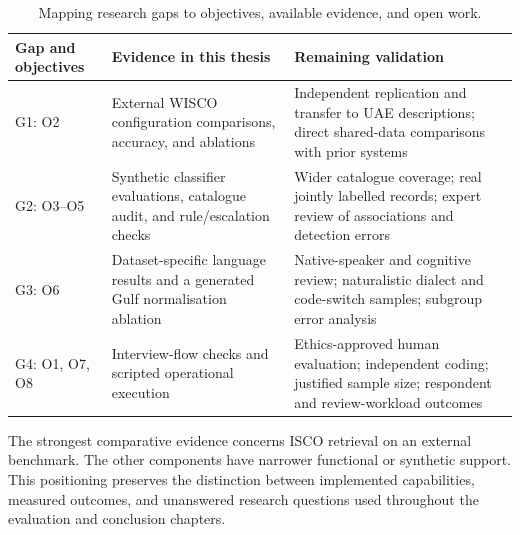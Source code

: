 \begin{table}[htbp]
\centering
\caption{Mapping research gaps to objectives, available evidence, and open work.}
\label{tab:ch2-gap-mapping}
\small\renewcommand{\arraystretch}{1.3}
\begin{tabular}{>{\raggedright}p{1.8cm}
                >{\raggedright}p{4.6cm}
                >{\raggedright\arraybackslash}p{5.7cm}}
\toprule
\textbf{Gap and objectives} & \textbf{Evidence in this thesis} &
\textbf{Remaining validation} \\
\midrule
G1: O2 & External WISCO configuration comparisons, accuracy, and
  ablations & Independent replication and transfer to UAE descriptions;
  direct shared-data comparisons with prior systems \\
G2: O3--O5 & Synthetic classifier evaluations, catalogue audit, and
  rule/escalation checks & Wider catalogue coverage; real jointly labelled
  records; expert review of associations and detection errors \\
G3: O6 & Dataset-specific language results and a generated Gulf
  normalisation ablation & Native-speaker and cognitive review;
  naturalistic dialect and code-switch samples; subgroup error analysis \\
G4: O1, O7, O8 & Interview-flow checks and scripted operational
  execution & Ethics-approved human evaluation; independent coding;
  justified sample size; respondent and review-workload outcomes \\
\bottomrule
\end{tabular}
\end{table}

The strongest comparative evidence concerns ISCO retrieval on an external
benchmark. The other components have narrower functional or synthetic
support. This positioning preserves the distinction between implemented
capabilities, measured outcomes, and unanswered research questions used
throughout the evaluation and conclusion chapters.
